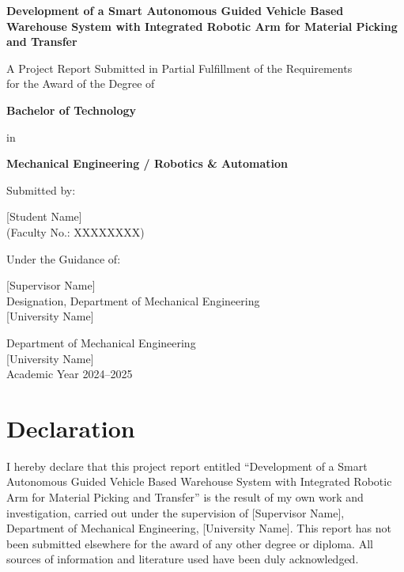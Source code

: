 \documentclass[12pt,a4paper,oneside]{report}
\begin{document}
\begin{titlepage}
\centering
\vspace*{2cm}

{\LARGE\bfseries Development of a Smart Autonomous Guided Vehicle Based Warehouse System with Integrated Robotic Arm for Material Picking and Transfer\par}
\vspace{1.5cm}
{\large A Project Report Submitted in Partial Fulfillment of the Requirements\\
for the Award of the Degree of\par}
\vspace{0.5cm}
{\Large\bfseries Bachelor of Technology\par}
\vspace{0.3cm}
{\large in\par}
\vspace{0.3cm}
{\Large\bfseries Mechanical Engineering / Robotics \& Automation\par}
\vspace{1.5cm}
{\large Submitted by:\par}
\vspace{0.3cm}
{\large [Student Name]\\(Faculty No.: XXXXXXXX)\par}
\vspace{1cm}
{\large Under the Guidance of:\par}
\vspace{0.3cm}
{\large [Supervisor Name]\\{}Designation, Department of Mechanical Engineering\\{}%
[University Name]\par}
\vspace{1cm}
{\large Department of Mechanical Engineering\\{}%
[University Name]\\{}%
Academic Year 2024--2025\par}
\end{titlepage}

\setcounter{page}{1}

\chapter*{Declaration}

I hereby declare that this project report entitled ``Development of a Smart Autonomous Guided Vehicle Based Warehouse System with Integrated Robotic Arm for Material Picking and Transfer'' is the result of my own work and investigation, carried out under the supervision of [Supervisor Name], Department of Mechanical Engineering, [University Name]. This report has not been submitted elsewhere for the award of any other degree or diploma. All sources of information and literature used have been duly acknowledged.
\end{document}
